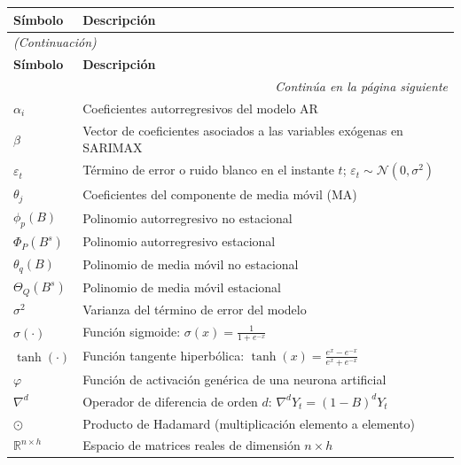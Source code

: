 \noindent
\begin{longtable}{p{3.5cm} p{10.5cm}}
\toprule
\textbf{Símbolo} & \textbf{Descripción} \\
\midrule
\endfirsthead
\multicolumn{2}{l}{\small\textit{(Continuación)}} \\[2pt]
\toprule
\textbf{Símbolo} & \textbf{Descripción} \\
\midrule
\endhead
\midrule
\multicolumn{2}{r}{\small\textit{Continúa en la página siguiente}} \\
\endfoot
\bottomrule
\endlastfoot
$\alpha_i$               & Coeficientes autorregresivos del modelo AR \\[3pt]
$\beta$                  & Vector de coeficientes asociados a las variables exógenas en SARIMAX \\[3pt]
$\varepsilon_t$          & Término de error o ruido blanco en el instante $t$;\; $\varepsilon_t \sim \mathcal{N}(0,\sigma^2)$ \\[3pt]
$\theta_j$               & Coeficientes del componente de media móvil (MA) \\[3pt]
$\phi_p(B)$              & Polinomio autorregresivo no estacional \\[3pt]
$\Phi_P(B^s)$            & Polinomio autorregresivo estacional \\[3pt]
$\theta_q(B)$            & Polinomio de media móvil no estacional \\[3pt]
$\Theta_Q(B^s)$          & Polinomio de media móvil estacional \\[3pt]
$\sigma^2$               & Varianza del término de error del modelo \\[3pt]
$\sigma(\cdot)$          & Función sigmoide:\; $\sigma(x) = \frac{1}{1+e^{-x}}$ \\[3pt]
$\tanh(\cdot)$           & Función tangente hiperbólica:\; $\tanh(x) = \frac{e^x - e^{-x}}{e^x + e^{-x}}$ \\[3pt]
$\varphi$                & Función de activación genérica de una neurona artificial \\[3pt]
$\nabla^d$               & Operador de diferencia de orden $d$:\; $\nabla^d Y_t = (1-B)^d Y_t$ \\[3pt]
$\odot$                  & Producto de Hadamard (multiplicación elemento a elemento) \\[3pt]
$\mathbb{R}^{n \times h}$ & Espacio de matrices reales de dimensión $n \times h$ \\[3pt]
\end{longtable}
